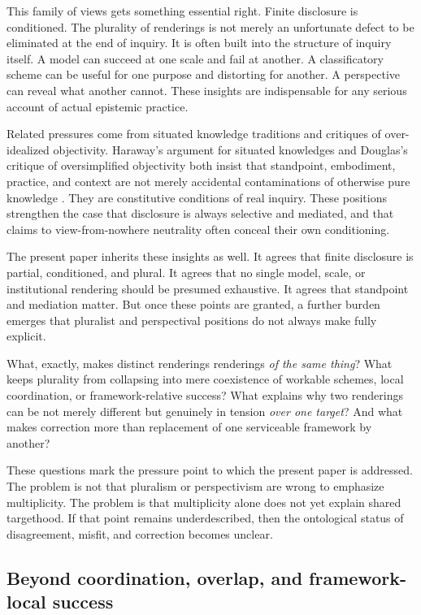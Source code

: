 \documentclass[11pt]{article}
\renewcommand{\emph}[1]{\textit{#1}}
\begin{document}
This family of views gets something essential right. Finite disclosure is conditioned. The plurality of renderings is not merely an unfortunate defect to be eliminated at the end of inquiry. It is often built into the structure of inquiry itself. A model can succeed at one scale and fail at another. A classificatory scheme can be useful for one purpose and distorting for another. A perspective can reveal what another cannot. These insights are indispensable for any serious account of actual epistemic practice.

Related pressures come from situated knowledge traditions and critiques of over-idealized objectivity. Haraway's argument for situated knowledges and Douglas's critique of oversimplified objectivity both insist that standpoint, embodiment, practice, and context are not merely accidental contaminations of otherwise pure knowledge \cite{Haraway1988SituatedKnowledges,Douglas2004IrreducibleComplexityObjectivity}. They are constitutive conditions of real inquiry. These positions strengthen the case that disclosure is always selective and mediated, and that claims to view-from-nowhere neutrality often conceal their own conditioning.

The present paper inherits these insights as well. It agrees that finite disclosure is partial, conditioned, and plural. It agrees that no single model, scale, or institutional rendering should be presumed exhaustive. It agrees that standpoint and mediation matter. But once these points are granted, a further burden emerges that pluralist and perspectival positions do not always make fully explicit.

What, exactly, makes distinct renderings renderings \emph{of the same thing}? What keeps plurality from collapsing into mere coexistence of workable schemes, local coordination, or framework-relative success? What explains why two renderings can be not merely different but genuinely in tension \emph{over one target}? And what makes correction more than replacement of one serviceable framework by another?

These questions mark the pressure point to which the present paper is addressed. The problem is not that pluralism or perspectivism are wrong to emphasize multiplicity. The problem is that multiplicity alone does not yet explain shared targethood. If that point remains underdescribed, then the ontological status of disagreement, misfit, and correction becomes unclear.

\subsection{Beyond coordination, overlap, and framework-local success}
\end{document}
